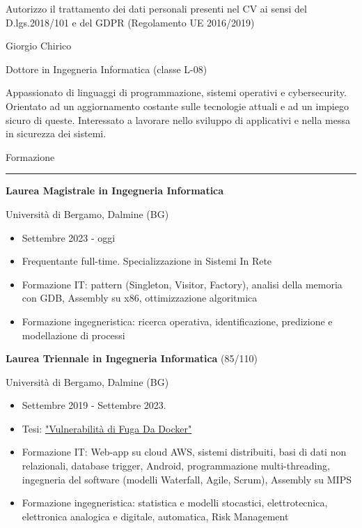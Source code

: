 \documentclass[a4paper]{letter}
\begin{document}
\hfill
\begin{minipage}[t]{0.65\textwidth}
\setlength{\baselineskip}{1.4\baselineskip}

{\tiny Autorizzo il trattamento dei dati personali presenti nel CV ai sensi del D.lgs.2018/101 e del GDPR (Regolamento UE 2016/2019)}
\vspace{0.3cm}


{\huge Giorgio Chirico}

{\large Dottore in Ingegneria Informatica (classe L-08)}

\vspace{0.5cm}
 
Appassionato di linguaggi di programmazione, sistemi operativi e cybersecurity. Orientato ad un aggiornamento costante sulle tecnologie attuali e ad un impiego sicuro di queste. Interessato a lavorare nello sviluppo di applicativi e nella messa in sicurezza dei sistemi.

\vspace{0.5cm}

{\large Formazione}
\rule{\linewidth}{0.4pt}

{\large \textbf{Laurea Magistrale in Ingegneria Informatica}}

{\small Università di Bergamo, Dalmine (BG)}
\begin{itemize}
    \item Settembre 2023 - oggi
    \item Frequentante full-time. Specializzazione in Sistemi In Rete
    \item Formazione IT: pattern (Singleton, Visitor, Factory), analisi della memoria con GDB, Assembly su x86, ottimizzazione algoritmica
    \item Formazione ingegneristica: ricerca operativa, identificazione, predizione e modellazione di processi 
\end{itemize}

{\large \textbf{Laurea Triennale in Ingegneria Informatica} \small (85/110)}

{\small Università di Bergamo, Dalmine (BG)}
\begin{itemize}
    \item Settembre 2019 - Settembre 2023.
    \item Tesi: \href{https://github.com/giorgio-hash/tesi-triennio}{"Vulnerabilità di Fuga Da Docker"}
    \item Formazione IT: Web-app su cloud AWS, sistemi distribuiti, basi di dati non relazionali, database trigger, Android, programmazione multi-threading, ingegneria del software (modelli Waterfall, Agile, Scrum), Assembly su MIPS
    \item Formazione ingegneristica: statistica e modelli stocastici, elettrotecnica, elettronica analogica e digitale, automatica, Risk Management
\end{itemize}


\end{minipage}
\end{document}

